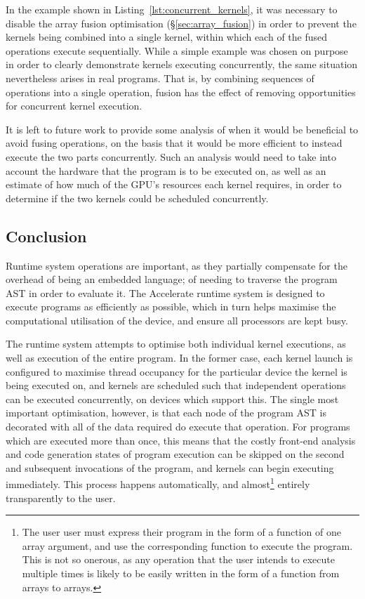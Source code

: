 In the example shown in Listing~\ref{lst:concurrent_kernels}, it was necessary
to disable the array fusion optimisation (\S\ref{sec:array_fusion}) in order to
prevent the kernels being combined into a single kernel, within which each of
the fused operations execute sequentially. While a simple example was chosen on
purpose in order to clearly demonstrate kernels executing concurrently, the same
situation nevertheless arises in real programs. That is, by combining sequences
of operations into a single operation, fusion has the effect of removing
opportunities for concurrent kernel execution.

It is left to future work to provide some analysis of when it would be
beneficial to avoid fusing operations, on the basis that it would be more
efficient to instead execute the two parts concurrently. Such an analysis would
need to take into account the hardware that the program is to be executed on, as
well as an estimate of how much of the GPU's resources each kernel requires, in
order to determine if the two kernels could be scheduled concurrently.


\subsection{Conclusion}

Runtime system operations are important, as they partially compensate for the
overhead of being an embedded language; of needing to traverse the program AST
in order to evaluate it. The Accelerate runtime system is designed to execute
programs as efficiently as possible, which in turn helps maximise the
computational utilisation of the device, and ensure all processors are kept
busy.

The runtime system attempts to optimise both individual kernel executions, as
well as execution of the entire program. In the former case, each kernel launch
is configured to maximise thread occupancy for the particular device the kernel
is being executed on, and kernels are scheduled such that independent operations
can be executed concurrently, on devices which support this. The single most
important optimisation, however, is that each node of the program AST is
decorated with all of the data required do execute that operation. For programs
which are executed more than once, this means that the costly front-end analysis
and code generation states of program execution can be skipped on the second and
subsequent invocations of the program, and kernels can begin executing
immediately. This process happens automatically, and almost\footnote{The user
user must express their program in the form of a function of one array argument,
and use the corresponding  function to execute the program. This is
not so onerous, as any operation that the user intends to execute multiple times
is likely to be easily written in the form of a function from arrays to arrays.}
entirely transparently to the user.


